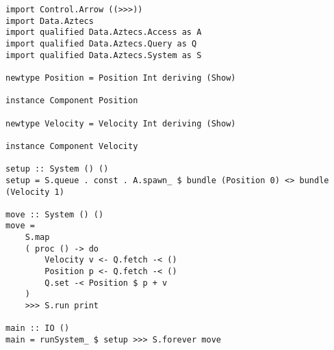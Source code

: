 \documentclass[sigplan,screen,nonacm]{acmart}
\begin{document}
\begin{lstlisting}
import Control.Arrow ((>>>))
import Data.Aztecs
import qualified Data.Aztecs.Access as A
import qualified Data.Aztecs.Query as Q
import qualified Data.Aztecs.System as S

newtype Position = Position Int deriving (Show)

instance Component Position

newtype Velocity = Velocity Int deriving (Show)

instance Component Velocity

setup :: System () ()
setup = S.queue . const . A.spawn_ $ bundle (Position 0) <> bundle (Velocity 1)

move :: System () ()
move =
    S.map
    ( proc () -> do
        Velocity v <- Q.fetch -< ()
        Position p <- Q.fetch -< ()
        Q.set -< Position $ p + v
    )
    >>> S.run print

main :: IO ()
main = runSystem_ $ setup >>> S.forever move
\end{lstlisting}



\end{document}

